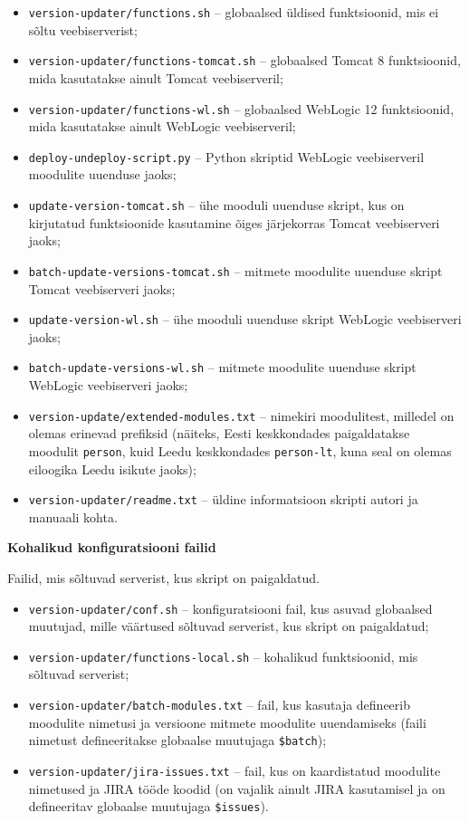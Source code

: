 \documentclass[12pt]{report}
\newcommand{\code}[1]{\texttt{#1}}
\begin{document}
  \begin{itemize}
    \item \code{version-updater/functions.sh} \--- globaalsed üldised funktsioonid, mis ei sõltu veebiserverist;
    \item \code{version-updater/functions-tomcat.sh} \--- globaalsed Tomcat 8 funktsioonid, mida kasutatakse ainult Tomcat veebiserveril;
    \item \code{version-updater/functions-wl.sh} \--- globaalsed WebLogic 12 funktsioonid, mida kasutatakse ainult WebLogic veebiserveril;
    \item \code{deploy-undeploy-script.py} \--- Python skriptid WebLogic veebiserveril moodulite uuenduse jaoks;
    \item \code{update-version-tomcat.sh} \--- ühe mooduli uuenduse skript, kus on kirjutatud funktsioonide kasutamine õiges järjekorras Tomcat veebiserveri jaoks;
    \item \code{batch-update-versions-tomcat.sh} \--- mitmete moodulite uuenduse skript Tomcat veebiserveri jaoks;
    \item \code{update-version-wl.sh} \--- ühe mooduli uuenduse skript WebLogic veebiserveri jaoks;
    \item \code{batch-update-versions-wl.sh} \--- mitmete moodulite uuenduse skript WebLogic veebiserveri jaoks;
    \item \code{version-update/extended-modules.txt} \--- nimekiri moodulitest, milledel on olemas erinevad prefiksid (näiteks, Eesti keskkondades paigaldatakse moodulit \code{person}, kuid Leedu keskkondades \code{person-lt}, kuna seal on olemas eiloogika Leedu isikute jaoks);
    \item \code{version-updater/readme.txt} \--- üldine informatsioon skripti autori ja manuaali kohta.
  \end{itemize}
  
  \textbf{Kohalikud konfiguratsiooni failid}
  
  Failid, mis sõltuvad serverist, kus skript on paigaldatud.
  
  \begin{itemize}
    \item \code{version-updater/conf.sh} \--- konfiguratsiooni fail, kus asuvad globaalsed muutujad, mille väärtused sõltuvad serverist, kus skript on paigaldatud;
    \item \code{version-updater/functions-local.sh} \--- kohalikud funktsioonid, mis sõltuvad serverist;
    \item \code{version-updater/batch-modules.txt} \--- fail, kus kasutaja defineerib moodulite nimetusi ja versioone mitmete moodulite uuendamiseks (faili nimetust defineeritakse globaalse muutujaga \code{\$batch});
    \item \code{version-updater/jira-issues.txt} \--- fail, kus on kaardistatud moodulite nimetused ja JIRA tööde koodid (on vajalik ainult JIRA kasutamisel ja on defineeritav globaalse muutujaga \code{\$issues}).
  \end{itemize}
  
\end{document}
